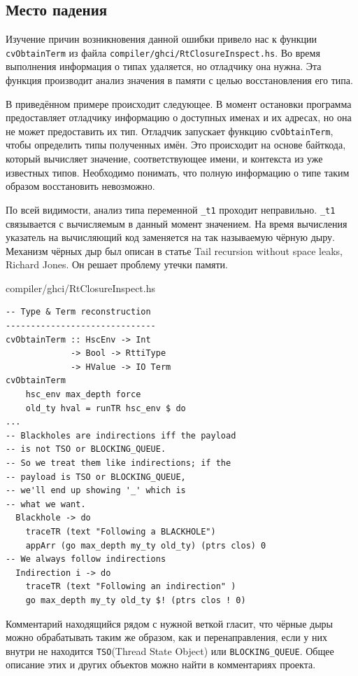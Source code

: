 \documentclass[fontsize=14pt, paper=a4, pagesize, DIV=calc]{scrartcl}
\def\code#1{\texttt{#1}}
\begin{document}
\subsection{Место падения}

Изучение причин возникновения данной ошибки привело нас к функции
\code{cvObtainTerm} из файла \code{compiler/ghci/RtClosureInspect.hs}. Во
время выполнения информация о типах удаляется, но отладчику она нужна. Эта
функция производит анализ значения в памяти с целью восстановления его типа.

В приведённом примере происходит следующее. В момент остановки программа
предоставляет отладчику информацию о доступных именах и их адресах, но она не
может предоставить их тип. Отладчик запускает функцию \code{cvObtainTerm},
чтобы определить типы полученных имён. Это происходит на основе байткода,
который вычисляет значение, соответствующее имени, и контекста из уже известных
типов. Необходимо понимать, что полную информацию о типе таким образом
восстановить невозможно.

По всей видимости, анализ типа переменной \code{\_t1} проходит неправильно.
\code{\_t1} связывается с вычисляемым в данный момент значением. На время
вычисления указатель на вычисляющий код заменяется на так называемую чёрную
дыру. Механизм чёрных дыр был описан в статье Tail recursion without space
leaks, Richard Jones\cite{blackholes}. Он решает проблему утечки памяти.

\begin{ListingEnv}
\caption{compiler/ghci/RtClosureInspect.hs}
\begin{lstlisting}[firstnumber=644]
-- Type & Term reconstruction
------------------------------
cvObtainTerm :: HscEnv -> Int 
             -> Bool -> RttiType 
             -> HValue -> IO Term
cvObtainTerm 
    hsc_env max_depth force 
    old_ty hval = runTR hsc_env $ do
...
-- Blackholes are indirections iff the payload 
-- is not TSO or BLOCKING_QUEUE.
-- So we treat them like indirections; if the 
-- payload is TSO or BLOCKING_QUEUE,
-- we'll end up showing '_' which is 
-- what we want.
  Blackhole -> do 
    traceTR (text "Following a BLACKHOLE")
    appArr (go max_depth my_ty old_ty) (ptrs clos) 0
-- We always follow indirections
  Indirection i -> do 
    traceTR (text "Following an indirection" )
    go max_depth my_ty old_ty $! (ptrs clos ! 0)
\end{lstlisting}
\end{ListingEnv}

Комментарий находящийся рядом с нужной веткой гласит, что чёрные дыры можно
обрабатывать таким же образом, как и перенаправления, если у них внутри не
находится \code{TSO}(Thread State Object) или \code{BLOCKING\_QUEUE}. Общее
описание этих и других объектов можно найти в комментариях
проекта\cite{commentary}.
\end{document}
